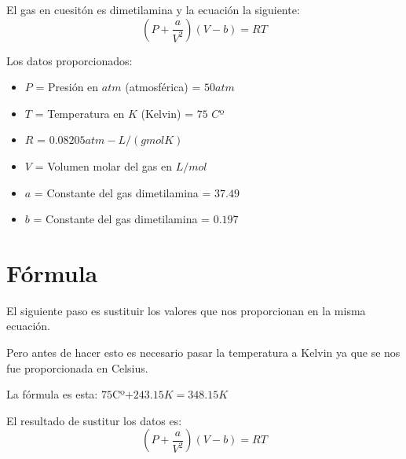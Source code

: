 \documentclass{article}
\begin{document}
El gas en cuesitón es dimetilamina y la ecuación la siguiente:
$$ (P+\frac{a}{V^2})(V-b)=RT $$

Los datos proporcionados:
\begin{itemize}
    \item $P$ = Presión en $atm$ (atmosférica) = $50 atm$
    \item $T$ = Temperatura en $K$ (Kelvin) = $75$ $C$º
    \item $R$ = $0.08205 atm-L/(gmolK)$
    \item $V$ = Volumen molar del gas en $L/mol$
    \item $a$ = Constante del gas dimetilamina = $37.49$
    \item $b$ = Constante del gas dimetilamina = $0.197$
\end{itemize}

\section{Fórmula}
El siguiente paso es sustituir los valores que nos proporcionan en la misma ecuación.

Pero antes de hacer esto es necesario pasar la temperatura a Kelvin ya que se nos fue proporcionada en Celsius.

La fórmula es esta: $75$Cº$+243.15K= 348.15K$


El resultado de sustitur los datos es:
$$ (P+\frac{a}{V^2})(V-b)=RT $$
\end{document}
